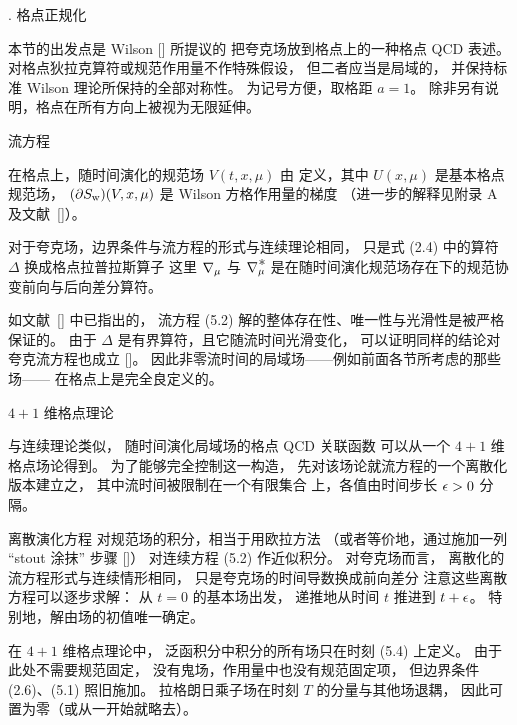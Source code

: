 
. 格点正规化

本节的出发点是 Wilson [\cite{Wilson}] 所提议的
把夸克场放到格点上的一种格点 QCD 表述。
对格点狄拉克算符或规范作用量不作特殊假设，
但二者应当是局域的，
并保持标准 Wilson 理论所保持的全部对称性。
为记号方便，取格距 $a=1$。
除非另有说明，格点在所有方向上被视为无限延伸。


 流方程

在格点上，随时间演化的规范场 $V(t,x,\mu)$ 由
定义，其中 $U(x,\mu)$ 是基本格点规范场，
$(\partial S_{\rm w})(V,x,\mu)$ 是 Wilson 方格作用量的梯度
（进一步的解释见附录 A 及文献~[\cite{WilsonFlow}]）。

对于夸克场，边界条件与流方程的形式与连续理论相同，
只是式 (2.4) 中的算符 $\Delta$
换成格点拉普拉斯算子
\equation{
  \Delta=\nabstar{\mu}\nab{\mu},
  \enum
}
这里 ${\nabla_{\mu}}$ 与 $\nabstar{\mu}$
是在随时间演化规范场存在下的规范协变前向与后向差分算符。

如文献~[\cite{WilsonFlow}] 中已指出的，
流方程 (5.2) 解的整体存在性、唯一性与光滑性是被严格保证的。
由于 $\Delta$ 是有界算符，且它随流时间光滑变化，
可以证明同样的结论对夸克流方程也成立
[\cite{ArnoldI}]。
因此非零流时间的局域场——例如前面各节所考虑的那些场——
在格点上是完全良定义的。


 $4+1$ 维格点理论

与连续理论类似，
随时间演化局域场的格点 QCD 关联函数
可以从一个 $4+1$ 维格点场论得到。
为了能够完全控制这一构造，
先对该场论就流方程的一个离散化版本建立之，
其中流时间被限制在一个有限集合
上，各值由时间步长 $\epsilon>0$ 分隔。

离散演化方程
对规范场的积分，相当于用欧拉方法
（或者等价地，通过施加一列 ``stout 涂抹'' 步骤 [\cite{Stout}]）
对连续方程 (5.2) 作近似积分。
对夸克场而言，
离散化的流方程形式与连续情形相同，
只是夸克场的时间导数换成前向差分
注意这些离散方程可以逐步求解：
从 $t=0$ 的基本场出发，
递推地从时间 $t$ 推进到 $t+\epsilon$。
特别地，解由场的初值唯一确定。

在 $4+1$ 维格点理论中，
泛函积分中积分的所有场只在时刻 (5.4) 上定义。
由于此处不需要规范固定，
没有鬼场，作用量中也没有规范固定项，
但边界条件 (2.6)、(5.1) 照旧施加。
拉格朗日乘子场在时刻 $T$ 的分量与其他场退耦，
因此可置为零（或从一开始就略去）。

